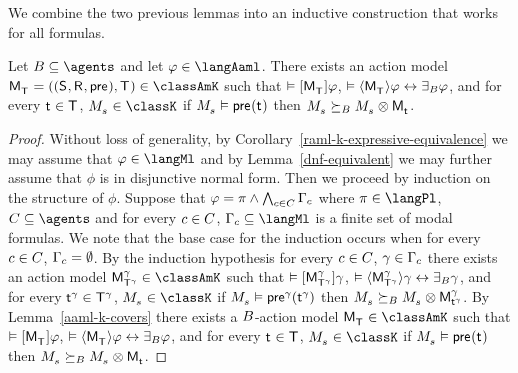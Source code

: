 We combine the two previous lemmas into an inductive construction that works for all formulas.

\begin{theorem}\label{aaml-k-synthesis}
Let $\agentsB \subseteq \agents$ and let $\phi \in \langAaml$.
There exists an action model $\aPModelAndTuple{\aStatesT} \in \classAmK$ such that 
$\entails \actionA{\aPModel{\aStatesT}} \phi$,
$\entails \actionE{\aPModel{\aStatesT}} \phi \iff \someactsBs \phi$, and
for every $\aStateT \in \aStatesT$, $\kPModel{\kStateS} \in \classK$ if $\kPModel{\kStateS} \entails \aPrecondition(\aStateT)$ then $\kPModel{\kStateS} \simulatesBs \kPModel{\kStateS} \exec \aPModel{\aStateT}$.
\end{theorem}

\begin{proof}
Without loss of generality, by Corollary~\ref{raml-k-expressive-equivalence} we may assume that $\phi \in \langMl$ and by Lemma~\ref{dnf-equivalent} we may further assume that $\phi$ is in disjunctive normal form.
Then we proceed by induction on the structure of $\phi$.  
Suppose that $\phi = \pi \land \bigwedge_{\agentC \in \agentsC} \Gamma_\agentC$ where $\pi \in \langPl$, $\agentsC \subseteq \agents$ and for every $\agentC \in \agentsC$, $\Gamma_\agentC \subseteq \langMl$ is a finite set of modal formulas.
We note that the base case for the induction occurs when for every $\agentC \in \agentsC$, $\Gamma_\agentC = \emptyset$.
By the induction hypothesis for every $\agentC \in \agentsC$, $\gamma \in \Gamma_\agentC$ there exists 
an action model $\aPModel[\gamma]{\aStatesT[\gamma]} \in \classAmK$ such that
$\entails \actionA{\aPModel[\gamma]{\aStatesT[\gamma]}} \gamma$,
$\entails \actionE{\aPModel[\gamma]{\aStatesT[\gamma]}} \gamma \iff \someactsBs \gamma$, and
for every $\aStateT[\gamma] \in \aStatesT[\gamma]$, $\kPModel{\kStateS} \in \classK$ if $\kPModel{\kStateS} \entails \aPrecondition[\gamma](\aStateT[\gamma])$ then $\kPModel{\kStateS} \simulatesBs \kPModel{\kStateS} \exec \aPModel[\gamma]{\aStateT[\gamma]}$.
By Lemma~\ref{aaml-k-covers} there exists a $\agentsB$-action model $\aPModel{\aStatesT} \in \classAmK$ such that 
$\entails \actionA{\aPModel{\aStatesT}} \phi$,
$\entails \actionE{\aPModel{\aStatesT}} \phi \iff \someactsBs \phi$, and
for every $\aStateT \in \aStatesT$, $\kPModel{\kStateS} \in \classK$ if $\kPModel{\kStateS} \entails \aPrecondition(\aStateT)$ then $\kPModel{\kStateS} \simulatesBs \kPModel{\kStateS} \exec \aPModel{\aStateT}$.


\end{proof}
